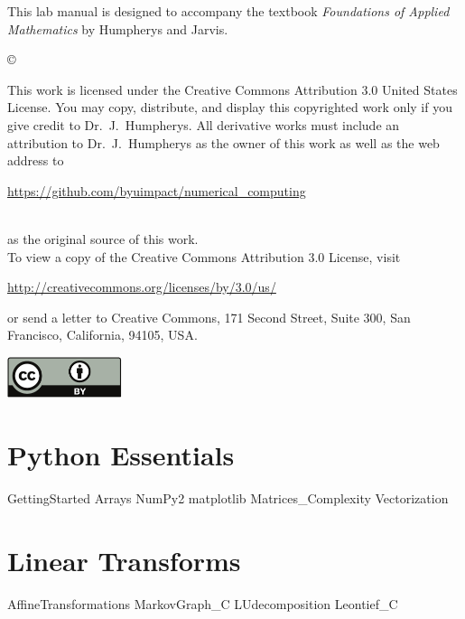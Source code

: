 \documentclass[nociteref]{newsiambook}
\begin{document}
\begin{thepreface}
This lab manual is designed to accompany the textbook \emph{Foundations of Applied Mathematics} by Humpherys and Jarvis.

\vfill
\copyright{This work is licensed under the Creative Commons Attribution 3.0 United States
License.  You may copy, distribute, and display this copyrighted work only if you give
credit to Dr.~J.~Humpherys. All derivative works must include an attribution to Dr.~J.~Humpherys as the owner of this work as well as the web address to
\\\centerline{\url{https://github.com/byuimpact/numerical_computing}}\\ as the original source of
this
work.\\To view a copy of the Creative Commons Attribution 3.0 License,
visit\\\centerline{\url{http://creativecommons.org/licenses/by/3.0/us/}} or send a letter to
Creative Commons, 171 Second Street, Suite 300, San Francisco, California, 94105, USA.}

\vfill
\centering\includegraphics[height=1.2cm]{by}
\vfill
\end{thepreface}

\setcounter{tocdepth}{1}
\tableofcontents

\mainmatter

\part{Python Essentials}
{GettingStarted}
{Arrays}
{NumPy2}
{matplotlib}
{Matrices_Complexity}
{Vectorization}

\part{Linear Transforms}
{AffineTransformations}
{MarkovGraph_C}
{LUdecomposition}
{Leontief_C}
\end{document}
